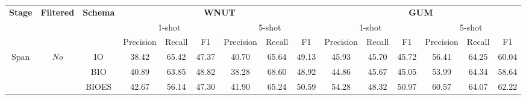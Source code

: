 \documentclass[11pt]{article}
\begin{document}
\begin{table*}[htb]
    \centering
    \small
    \setlength{\tabcolsep}{1.2mm}
    \resizebox{\textwidth}{!}
    {
        \begin{tabular}{ccccccccccccccc}
        \toprule
        \multirow{3}{*}{\textbf{Stage}} & \multirow{3}{*}{\textbf{Filtered}}             & \multirow{3}{*}{\textbf{Schema}} & \multicolumn{6}{c}{\textbf{WNUT}}                             & \multicolumn{6}{c}{\textbf{GUM}}                            \\
        \cmidrule(lr){4-9} \cmidrule(lr){10-15} 
                                        &                                                &                                  & \multicolumn{3}{c}{1-shot}    & \multicolumn{3}{c}{5-shot}    & \multicolumn{3}{c}{1-shot}    & \multicolumn{3}{c}{5-shot}    \\
        \cmidrule(lr){4-6} \cmidrule(lr){7-9} \cmidrule(lr){10-12} \cmidrule(lr){13-15} 
                                        &                                                &                                  & Precision & Recall  & F1      & Precision & Recall  & F1      & Precision & Recall  & F1      & Precision & Recall  & F1      \\
        \cmidrule(lr){1-3} \cmidrule(lr){4-9} \cmidrule(lr){10-15} 
        \multirow{6}{*}{Span}           & \multirow{3}{*}{\textit{No}}  & IO                                                & 38.42              & 65.42              & 47.37              & 40.70              & 65.64              & 49.13              & 45.93              & 45.70              & 45.72              & 56.41              & 64.25              & 60.04              \\
                                        &                                                & BIO                              & 40.89              & 63.85              & 48.82              & 38.28              & 68.60              & 48.92              & 44.86              & 45.67              & 45.05              & 53.99              & 64.34              & 58.64              \\
                                        &                                                & BIOES                            & 42.67              & 56.14              & 47.30              & 41.90              & 65.24              & 50.59              & 54.28              & 48.32              & 50.97              & 60.57              & 64.07              & 62.22              \\

\end{tabular}}
\end{table*}
\end{document}
